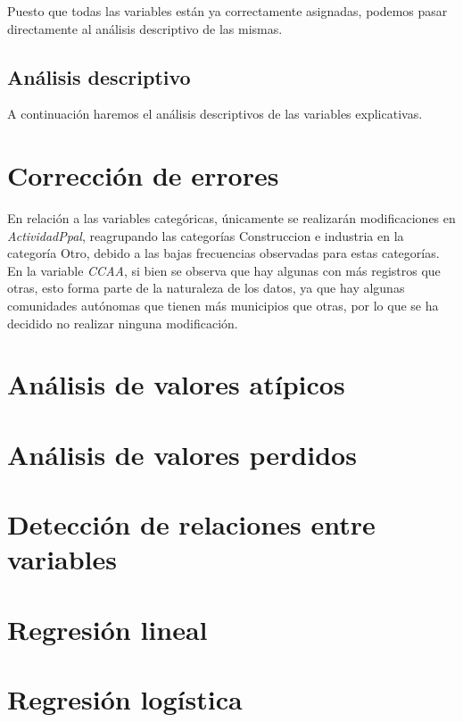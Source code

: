 \documentclass[a4paper,onecolumn]{article}
\begin{document}
\begin{sloppypar}
Puesto que todas las variables están ya correctamente asignadas, podemos pasar directamente al análisis descriptivo de las mismas.

\subsection{Análisis descriptivo}
A continuación haremos el análisis descriptivos de las variables explicativas.

\section{Corrección de errores}

En relación a las variables categóricas, únicamente se realizarán modificaciones en \textit{ActividadPpal}, reagrupando las categorías Construccion e industria
en la categoría Otro, debido a las bajas frecuencias observadas para estas categorías. En la variable \textit{CCAA}, si bien se observa que hay algunas con
más registros que otras, esto forma parte de la naturaleza de los datos, ya que hay algunas comunidades autónomas que tienen más municipios que otras, por lo 
que se ha decidido no realizar ninguna modificación.

\section{Análisis de valores atípicos}
\section{Análisis de valores perdidos}
\section{Detección de relaciones entre variables}
\section{Regresión lineal}
\section{Regresión logística}

\begin{comment}
Todas las variables correcatmente asignadas.
Frecuencia en categoricas. algunos ayuntamieentos repetidos, tiene sentido (mieres en cataluña y asturias).
CCAA:hay mas valores en unas que otras,pero tiene sentido. actividadppal agrupamos construccion e industria en otros. vemos valores perdidos en densidad (?)
abstencion alta, izquierda y derecha dos valores: normal. hay valores perdidos en todos los casos, pero puede deberse a perdidos o a valores repetidos


\end{comment}
\end{sloppypar}
\end{document}
